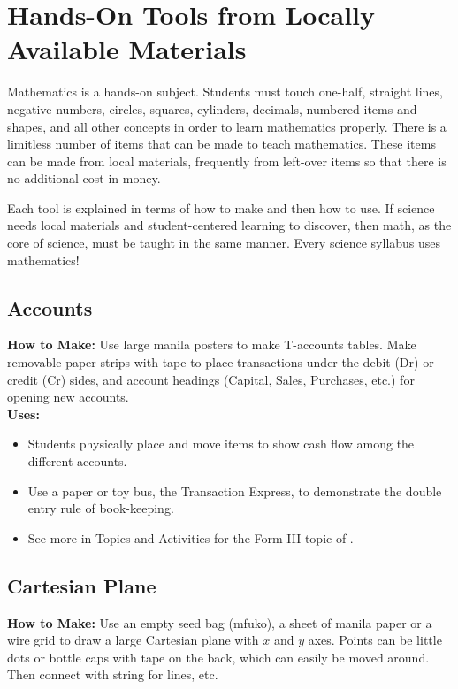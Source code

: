 \chapter{Hands-On Tools from Locally Available Materials} 

Mathematics is a hands-on subject. Students must touch one-half, straight lines, negative numbers, circles, squares, cylinders, decimals, numbered items and shapes, and all other concepts in order to learn mathematics properly. There is a limitless number of items that can be made to teach mathematics. These items can be made from local materials, frequently from left-over items so that there is no additional cost in money.

Each tool is explained in terms of how to make and then how to use. If science needs local materials and student-centered learning to discover, then math, as the core of science, must be taught in the same manner. Every science syllabus uses mathematics!

\section{Accounts} \label{accountstools}
\textbf{How to Make:} Use large manila posters to make T-accounts tables. Make removable paper strips with tape to place transactions under the debit (Dr) or credit (Cr) sides, and account headings (Capital, Sales, Purchases, etc.) for opening new accounts.\\

\noindent\textbf{Uses:}
\begin{itemize}
\item Students physically place and move items to show cash flow among the different accounts.
\item Use a paper or toy bus, the Transaction Express, to demonstrate the double entry rule of book-keeping.
\item See more in Topics and Activities for the Form III topic of .
\end{itemize}

\section{Cartesian Plane} \label{cartesianplane}
\textbf{How to Make:} Use an empty seed bag (mfuko), a sheet of manila paper or a wire grid to draw a large Cartesian plane with $x$ and $y$ axes. Points can be little dots or bottle caps with tape on the back, which can easily be moved around. Then connect with string for lines, etc.\\

